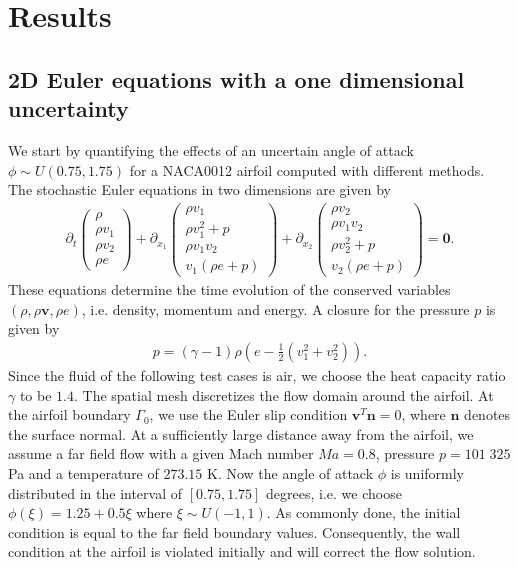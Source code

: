 \section{Results}
\label{sec:results}

\subsection{2D Euler equations with a one dimensional uncertainty}
\label{sec:resultsNACA1D}
We start by quantifying the effects of an uncertain angle of attack $\phi\sim U(0.75,1.75)$ for a NACA0012 airfoil computed with different methods. The stochastic Euler equations in two dimensions are given by
\begin{align*}
\partial_t
\begin{pmatrix}
\rho \\ \rho v_1 \\ \rho v_2 \\ \rho e
\end{pmatrix}
+\partial_{x_1}
\begin{pmatrix}
\rho v_1 \\ \rho v_1^2 +p \\ \rho v_1 v_2 \\  v_1 (\rho e+p)
\end{pmatrix}
+\partial_{x_2}
\begin{pmatrix}
\rho v_2 \\ \rho v_1 v_2 \\ \rho v_2^2+p \\ v_2 (\rho e+p)
\end{pmatrix}
=\bm{0}.
\end{align*}
These equations determine the time evolution of the conserved variables $(\rho,\rho \bm v, \rho e)$, i.e. density, momentum and energy. A closure for the pressure $p$ is given by
\begin{align*}
p = (\gamma-1)\rho\left(e-\frac12(v_1^2+v_2^2)\right).
\end{align*}
Since the fluid of the following test cases is air, we choose the heat capacity ratio $\gamma$ to be $1.4$. The spatial mesh discretizes the flow domain around the airfoil. At the airfoil boundary $\Gamma_{0}$, we use the Euler slip condition $\bm v^T\bm n = 0$, where $\bm n$ denotes the surface normal. At a sufficiently large distance away from the airfoil, we assume a far field flow with a given Mach number $Ma = 0.8$, pressure $p = 101\;325$ Pa and a temperature of $273.15$ K. Now the angle of attack $\phi$ is uniformly distributed in the interval of $[0.75,1.75]$ degrees, i.e. we choose $\phi(\xi) = 1.25 + 0.5\xi$ where $\xi\sim U(-1,1)$. As commonly done, the initial condition is equal to the far field boundary values. Consequently, the wall condition at the airfoil is violated initially and will correct the flow solution. 

